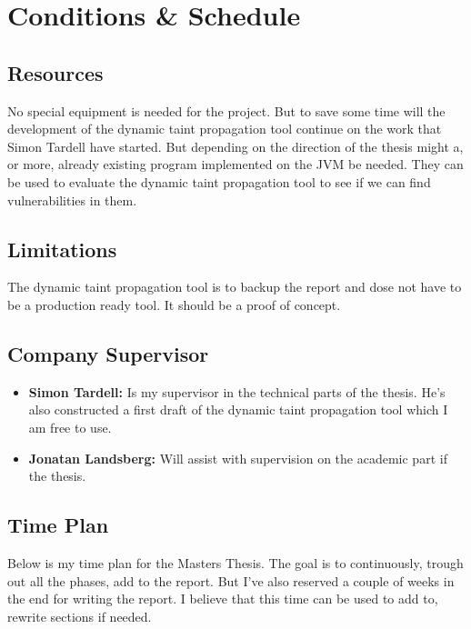 \documentclass{../kththesis}
\begin{document}
\chapter{Conditions \& Schedule}
\section{Resources}
No special equipment is needed for the project. But to save some time will the development of the dynamic taint propagation tool continue on the work that Simon Tardell have started. But depending on the direction of the thesis might a, or more, already existing program implemented on the JVM be needed. They can be used to evaluate the dynamic taint propagation tool to see if we can find vulnerabilities in them.


\section{Limitations}
The dynamic taint propagation tool is to backup the report and dose not have to be a production ready tool. It should be a proof of concept. 


\section{Company Supervisor}
\begin{itemize}
	\item \textbf{Simon Tardell:} Is my supervisor in the technical parts of the thesis. He's also constructed a first draft of the dynamic taint propagation tool which I am free to use.
	\item \textbf{Jonatan Landsberg:} Will assist with supervision on the academic part if the thesis.
\end{itemize}


\section{Time Plan}
Below is my time plan for the Masters Thesis. The goal is to continuously, trough out all the phases, add to the report. But I've also reserved a couple of weeks in the end for writing the report. I believe that this time can be used to add to, rewrite sections if needed.  \\ \\
\end{document}
